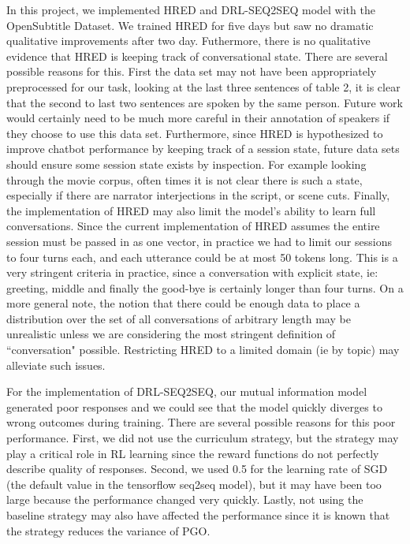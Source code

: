 In this project, we implemented HRED and DRL-SEQ2SEQ model with the OpenSubtitle Dataset. We trained HRED for five days but saw no dramatic qualitative improvements after two day. Futhermore, there is no qualitative evidence that HRED is keeping track of conversational state. There are several possible reasons for this. First the data set may not have been appropriately preprocessed for our task, looking at the last three sentences of table 2, it is clear that the second to last two sentences are spoken by the same person. Future work would certainly need to be much more careful in their annotation of speakers if they choose to use this data set. Furthermore, since HRED is hypothesized to improve chatbot performance by keeping track of a session state, future data sets should ensure some session state exists by inspection. For example looking through the movie corpus, often times it is not clear there is such a state, especially if there are narrator interjections in the script, or scene cuts. Finally, the implementation of HRED may also limit the model's ability to learn full conversations. Since the current implementation of HRED assumes the entire session must be passed in as one vector, in practice we had to limit our sessions to four turns each, and each utterance could be at most 50 tokens long. This is a very stringent criteria in practice, since a conversation with explicit state, ie: greeting, middle and finally the good-bye is certainly longer than four turns. On a more general note, the notion that there could be enough data to place a distribution over the set of all conversations of arbitrary length may be unrealistic unless we are considering the most stringent definition of ``conversation" possible. Restricting HRED to a limited domain (ie by topic) may alleviate such issues. 

For the implementation of DRL-SEQ2SEQ, our mutual information model generated poor responses and we could see that the model quickly diverges to wrong outcomes during training. There are several possible reasons for this poor performance. First, we did not use the curriculum strategy, but the strategy may play a critical role in RL learning since the reward functions do not perfectly describe quality of responses. Second, we used 0.5 for the learning rate of SGD (the default value in the tensorflow seq2seq model), but it may have been too large because the performance changed very quickly. Lastly, not using the baseline strategy may also have affected the performance since it is known that the strategy reduces the variance of PGO. 